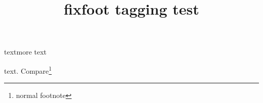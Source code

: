 \documentclass{article}
\title{fixfoot tagging test}
\begin{document}
text\sic more text

text\prooflater. Compare\footnote{normal footnote}
\end{document}
